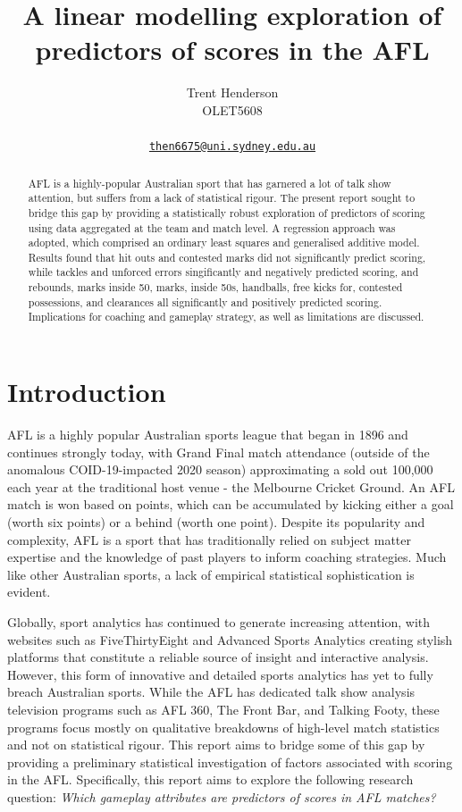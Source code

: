 \documentclass{article}
\title{A linear modelling exploration of predictors of scores in the AFL}
\author{
    Trent Henderson
   \\
    OLET5608 \\
   \\
  \texttt{\href{mailto:then6675@uni.sydney.edu.au}{\nolinkurl{then6675@uni.sydney.edu.au}}} \\
  }
\begin{document}
\maketitle

\def\tightlist{}


\begin{abstract}
AFL is a highly-popular Australian sport that has garnered a lot of talk
show attention, but suffers from a lack of statistical rigour. The
present report sought to bridge this gap by providing a statistically
robust exploration of predictors of scoring using data aggregated at the
team and match level. A regression approach was adopted, which comprised
an ordinary least squares and generalised additive model. Results found
that hit outs and contested marks did not significantly predict scoring,
while tackles and unforced errors singificantly and negatively predicted
scoring, and rebounds, marks inside 50, marks, inside 50s, handballs,
free kicks for, contested possessions, and clearances all significantly
and positively predicted scoring. Implications for coaching and gameplay
strategy, as well as limitations are discussed.
\end{abstract}


\hypertarget{introduction}{%
\section{Introduction}\label{introduction}}

AFL is a highly popular Australian sports league that began in 1896 and
continues strongly today, with Grand Final match attendance (outside of
the anomalous COID-19-impacted 2020 season) approximating a sold out
100,000 each year at the traditional host venue - the Melbourne Cricket
Ground. An AFL match is won based on points, which can be accumulated by
kicking either a goal (worth six points) or a behind (worth one point).
Despite its popularity and complexity, AFL is a sport that has
traditionally relied on subject matter expertise and the knowledge of
past players to inform coaching strategies. Much like other Australian
sports, a lack of empirical statistical sophistication is evident.

Globally, sport analytics has continued to generate increasing
attention, with websites such as FiveThirtyEight and Advanced Sports
Analytics creating stylish platforms that constitute a reliable source
of insight and interactive analysis. However, this form of innovative
and detailed sports analytics has yet to fully breach Australian sports.
While the AFL has dedicated talk show analysis television programs such
as AFL 360, The Front Bar, and Talking Footy, these programs focus
mostly on qualitative breakdowns of high-level match statistics and not
on statistical rigour. This report aims to bridge some of this gap by
providing a preliminary statistical investigation of factors associated
with scoring in the AFL. Specifically, this report aims to explore the
following research question: \emph{Which gameplay attributes are
predictors of scores in AFL matches?}
\end{document}
